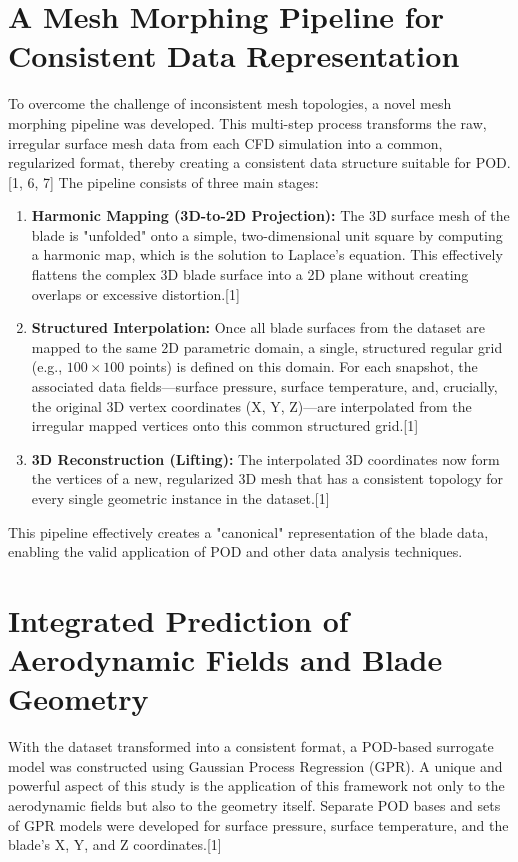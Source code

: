 \documentclass[12pt, a4paper]{report}
\begin{document}
\section{A Mesh Morphing Pipeline for Consistent Data Representation}

To overcome the challenge of inconsistent mesh topologies, a novel mesh morphing pipeline was developed. This multi-step process transforms the raw, irregular surface mesh data from each CFD simulation into a common, regularized format, thereby creating a consistent data structure suitable for POD.[1, 6, 7] The pipeline consists of three main stages:

\begin{enumerate}
    \item \textbf{Harmonic Mapping (3D-to-2D Projection):} The 3D surface mesh of the blade is "unfolded" onto a simple, two-dimensional unit square by computing a harmonic map, which is the solution to Laplace's equation. This effectively flattens the complex 3D blade surface into a 2D plane without creating overlaps or excessive distortion.[1]
    \item \textbf{Structured Interpolation:} Once all blade surfaces from the dataset are mapped to the same 2D parametric domain, a single, structured regular grid (e.g., $100 \times 100$ points) is defined on this domain. For each snapshot, the associated data fields—surface pressure, surface temperature, and, crucially, the original 3D vertex coordinates (X, Y, Z)—are interpolated from the irregular mapped vertices onto this common structured grid.[1]
    \item \textbf{3D Reconstruction (Lifting):} The interpolated 3D coordinates now form the vertices of a new, regularized 3D mesh that has a consistent topology for every single geometric instance in the dataset.[1]
\end{enumerate}

This pipeline effectively creates a "canonical" representation of the blade data, enabling the valid application of POD and other data analysis techniques.

\section{Integrated Prediction of Aerodynamic Fields and Blade Geometry}

With the dataset transformed into a consistent format, a POD-based surrogate model was constructed using Gaussian Process Regression (GPR). A unique and powerful aspect of this study is the application of this framework not only to the aerodynamic fields but also to the geometry itself. Separate POD bases and sets of GPR models were developed for surface pressure, surface temperature, and the blade's X, Y, and Z coordinates.[1]
\end{document}
